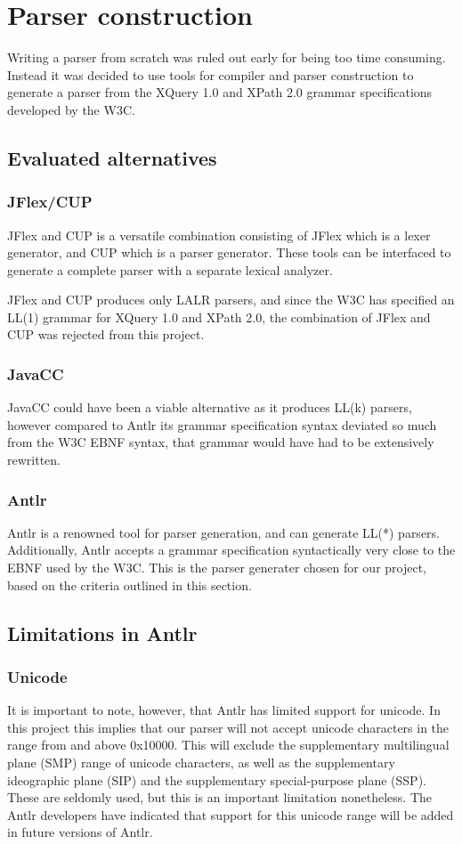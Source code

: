 \section{Parser construction}
Writing a parser from scratch was ruled out early for being too time consuming.
Instead it was decided to use tools for compiler and parser construction to
generate a parser from the XQuery 1.0 and XPath 2.0 grammar specifications
developed by the W3C.

\subsection{Evaluated alternatives}
\subsubsection{JFlex/CUP}
JFlex and CUP is a versatile combination consisting of JFlex which is a lexer
generator, and CUP which is a parser generator. These tools can be interfaced to
generate a complete parser with a separate lexical analyzer.

JFlex and CUP produces only LALR parsers, and since the W3C has specified an
LL(1) grammar for XQuery 1.0 and XPath 2.0, the combination of JFlex and CUP was
rejected from this project.

\subsubsection{JavaCC}
JavaCC could have been a viable alternative as it produces LL(k) parsers,
however compared to Antlr its grammar specification syntax deviated so much
from the W3C EBNF syntax, that grammar would have had to be extensively
rewritten.

\subsubsection{Antlr}
Antlr is a renowned tool for parser generation, and can generate LL(*) parsers.
Additionally, Antlr accepts a grammar specification syntactically very close to
the EBNF used by the W3C. This is the parser generater chosen for our project,
based on the criteria outlined in this section.

\subsection{Limitations in Antlr}
\subsubsection{Unicode}
It is important to note, however, that Antlr has limited support for unicode.
In this project this implies that our parser will not accept unicode characters
in the range from and above 0x10000. This will exclude the supplementary
multilingual plane (SMP) range of unicode characters, as well as the
supplementary ideographic plane (SIP) and the supplementary special-purpose
plane (SSP). These are seldomly used, but this is an important limitation
nonetheless. The Antlr developers have indicated that support for this unicode
range will be added in future versions of Antlr.

